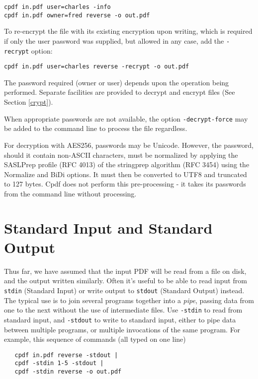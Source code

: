 \documentclass{book}
\begin{document}
\begin{framed}
\small\verb!cpdf in.pdf user=charles -info!\\
\indent\small\verb!cpdf in.pdf owner=fred reverse -o out.pdf!
\end{framed}

\noindent To re-encrypt the file with its existing encryption upon writing, which is required if only the user password was supplied, but allowed in any case, add the \texttt{-recrypt} option:

\begin{framed}
\small\verb!cpdf in.pdf user=charles reverse -recrypt -o out.pdf!
\end{framed}

\noindent The password required (owner or user) depends upon the operation
being performed. Separate facilities are provided to decrypt and encrypt files
(See Section \ref{crypt}).

When appropriate passwords are not available, the option \texttt{-decrypt-force} may be added to the command line to process the file regardless.

For decryption with AES256, passwords may be Unicode. However, the password, should it contain non-ASCII characters, must be normalized by applying the SASLPrep profile (RFC 4013) of the stringprep algorithm (RFC 3454) using the Normalize and BiDi options. It must then be converted to UTF8 and truncated to 127 bytes. Cpdf does not perform this pre-processing - it takes its passwords from the command line without processing.

  \section{Standard Input and Standard Output}
 
  Thus far, we have assumed that the input PDF will be read from a file on
disk, and the output written similarly. Often it's useful to be able to read
input from \texttt{stdin} (Standard Input) or write output to \texttt{stdout}
(Standard Output) instead. The typical use is to join several programs
together into a \textit{pipe}, passing data from one to the next without the
use of intermediate files. Use \texttt{-stdin} to read from standard input, and
\texttt{-stdout} to write to standard input, either to pipe data between
multiple programs, or multiple invocations of the same program. For example, this sequence of commands (all typed on one line)

  \begin{framed}
  \small\begin{verbatim}   cpdf in.pdf reverse -stdout |
   cpdf -stdin 1-5 -stdout |
   cpdf -stdin reverse -o out.pdf\end{verbatim}
  \end{framed}
\end{document}
